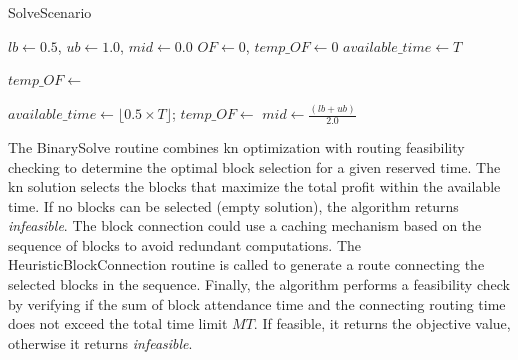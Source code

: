 \begin{algorithm}[h!]
	\caption{SolveScenario}
	\SetAlgoLined

	$lb \leftarrow 0.5$, $ub \leftarrow 1.0$, $mid \leftarrow 0.0$\;
	$OF \leftarrow 0$, $temp\_OF \leftarrow 0$\;
	$available\_time \leftarrow T$\;

	$temp\_OF \leftarrow$ \;

	$available\_time \leftarrow \lfloor 0.5 \times T \rfloor$; 
	$temp\_OF \leftarrow$ \;
	$mid \leftarrow \frac{(lb + ub)}{2.0}$\;


	\;
\end{algorithm}

The BinarySolve routine combines \gls{kn} optimization with routing feasibility checking to determine the optimal block selection for a given reserved time. The \gls{kn} solution selects the blocks that maximize the total profit within the available time. If no blocks can be selected (empty solution), the algorithm returns \textit{infeasible}. The block connection could use a caching mechanism based on the sequence of blocks to avoid redundant computations. The HeuristicBlockConnection routine is called to generate a route connecting the selected blocks in the sequence. Finally, the algorithm performs a feasibility check by verifying if the sum of block attendance time and the connecting routing time does not exceed the total time limit $MT$. If feasible, it returns the objective value, otherwise it returns \textit{infeasible}.

